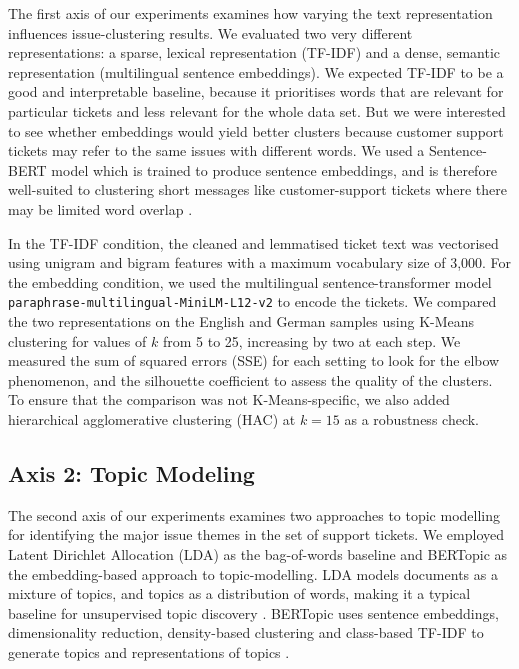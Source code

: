 \documentclass[11pt]{article}
\begin{document}
The first axis of our experiments examines how varying the text representation influences issue-clustering results. We evaluated two very different representations: a sparse, lexical representation (TF-IDF) and a dense, semantic representation (multilingual sentence embeddings). We expected TF-IDF to be a good and interpretable baseline, because it prioritises words that are relevant for particular tickets and less relevant for the whole data set. But we were interested to see whether embeddings would yield better clusters because customer support tickets may refer to the same issues with different words. We used a Sentence-BERT model which is trained to produce sentence embeddings, and is therefore well-suited to clustering short messages like customer-support tickets where there may be limited word overlap \citep{reimers2019sentence}.

In the TF-IDF condition, the cleaned and lemmatised ticket text was vectorised using unigram and bigram features with a maximum vocabulary size of 3,000. For the embedding condition, we used the multilingual sentence-transformer model \texttt{paraphrase-multilingual-MiniLM-L12-v2} to encode the tickets. We compared the two representations on the English and German samples using K-Means clustering for values of $k$ from 5 to 25, increasing by two at each step. We measured the sum of squared errors (SSE) for each setting to look for the elbow phenomenon, and the silhouette coefficient to assess the quality of the clusters. To ensure that the comparison was not K-Means-specific, we also added hierarchical agglomerative clustering (HAC) at $k=15$ as a robustness check.


\subsection{Axis 2: Topic Modeling}

The second axis of our experiments examines two approaches to topic modelling for identifying the major issue themes in the set of support tickets. We employed Latent Dirichlet Allocation (LDA) as the bag-of-words baseline and BERTopic as the embedding-based approach to topic-modelling. LDA models documents as a mixture of topics, and topics as a distribution of words, making it a typical baseline for unsupervised topic discovery \citep{blei2003latent}. BERTopic uses sentence embeddings, dimensionality reduction, density-based clustering and class-based TF-IDF to generate topics and representations of topics \citep{grootendorst2022bertopic}.
\end{document}
